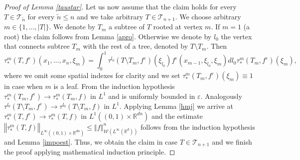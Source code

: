 \documentclass[10pt]{article}
\newcommand*{\norm}[1]{\left\Vert{#1}\right\Vert}
\newcommand{\ve}{\varepsilon}
\newcommand{\R}{\mathbb{R}}
\newcommand{\izj}{\int_{0}^{1}}
\newcommand{\Tree}{\mathcal{T}}
\newcommand{\W}{\mathcal{W}}
\begin{document}
\begin{proof}[Proof of Lemma \ref{taustar}]
Let us now assume that the claim holds for every $T \in \Tree_{\tilde{n}}$ for every $\tilde{n} \leq n$ and we take arbitrary $T \in \Tree_{n+1}$. We choose arbitrary $m \in \{1,\dots,|T|\}$. We denote by $T_m$ a subtree of $T$ rooted at vertex $m$.  If $m=1$ (a root) the claim follows from Lemma \ref{apro}. Otherwise we denote by $l_0$ the vertex that connects subtree $T_m$ with the rest of a tree, denoted by $T\setminus T_m$. Then
\[
\tau^m_{*}(T,f^{\ve})(x_1,\dots,x_{n},\xi_m) = \izj \tau^{l_0}(T \setminus T_m,f^\ve)(\xi_{l_0})f^{\ve}(x_{m-1},\xi_{l_0},\xi_m)dl_0 \tau_{*}^m(T_m,f^\ve)(\xi_m),
\]
where we omit some spatial indexes for clarity and we set $\tau_{*}^m(T_m,f^\ve)(\xi_m) \equiv 1$ in case when $m$ is a leaf. From the induction hypothesis $\tau_{*}^m(T_m,f^\ve) \rightarrow \tau_{*}^m(T_m,f)$ in $L^{1}$ and is uniformly bounded in $\ve$. Analogously $\tau^{l_0}(T \setminus T_m,f^\ve)\rightarrow \tau^{l_0}(T \setminus T_m,f)$ in $L^{1}$. Applying Lemma \ref{hmj} we arrive at $\tau^m_{*}(T,f^{\ve}) \rightarrow \tau^m_{*}(T,f)$ in $L^1((0,1)\times \R^{dn})$ and the estimate $\norm{\tau^m_{*}(T,f)}_{L^{\infty}((0,1)\times \R^{dn})} \leq \norm{f}^n_{\W(L^{\infty}(\R^d))}$ follows from the induction hypothesis and Lemma \ref{impoest}. Thus, we obtain the claim in case $T \in \Tree_{n+1}$ and we finish the proof applying mathematical induction principle. 
\end{proof}
\end{document}
